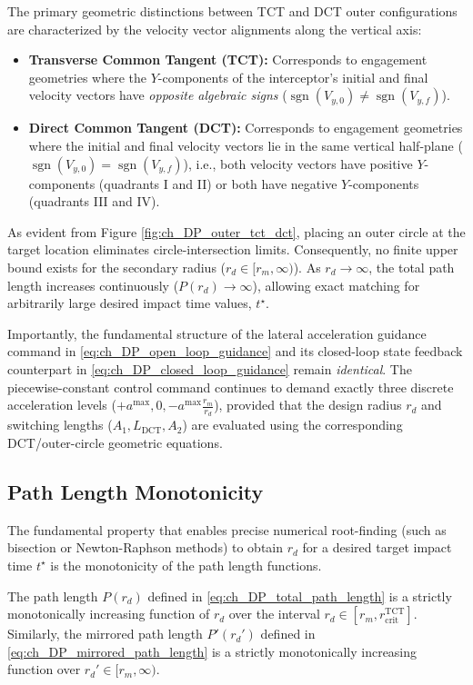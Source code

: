 The primary geometric distinctions between TCT and DCT outer configurations are characterized by the velocity vector alignments along the vertical axis:
\begin{itemize}
    \item \textbf{Transverse Common Tangent (TCT):} Corresponds to engagement geometries where the $Y$-components of the interceptor's initial and final velocity vectors have \emph{opposite algebraic signs} ($\operatorname{sgn}(V_{y,0}) \neq \operatorname{sgn}(V_{y,f})$).
    \item \textbf{Direct Common Tangent (DCT):} Corresponds to engagement geometries where the initial and final velocity vectors lie in the same vertical half-plane ($\operatorname{sgn}(V_{y,0}) = \operatorname{sgn}(V_{y,f})$), i.e., both velocity vectors have positive $Y$-components (quadrants I and II) or both have negative $Y$-components (quadrants III and IV).
\end{itemize}

As evident from Figure \ref{fig:ch_DP_outer_tct_dct}, placing an outer circle at the target location eliminates circle-intersection limits. Consequently, no finite upper bound exists for the secondary radius ($r_d \in [r_m, \infty)$). As $r_d \to \infty$, the total path length increases continuously ($P(r_d) \to \infty$), allowing exact matching for arbitrarily large desired impact time values, $t^{\star}$.

Importantly, the fundamental structure of the lateral acceleration guidance command in \eqref{eq:ch_DP_open_loop_guidance} and its closed-loop state feedback counterpart in \eqref{eq:ch_DP_closed_loop_guidance} remain \emph{identical}. The piecewise-constant control command continues to demand exactly three discrete acceleration levels ($+a^{\max}, 0, -a^{\max}\frac{r_m}{r_d}$), provided that the design radius $r_d$ and switching lengths ($A_1, L_{\text{DCT}}, A_2$) are evaluated using the corresponding DCT/outer-circle geometric equations.
\subsection{Path Length Monotonicity}\label{subsec:ch_DP_monotonicity}

The fundamental property that enables precise numerical root-finding (such as bisection or Newton-Raphson methods) to obtain $r_d$ for a desired target impact time $t^\star$ is the monotonicity of the path length functions.

\begin{remark}\label{rem:ch_DP_monotonicity}
The path length $P(r_d)$ defined in \eqref{eq:ch_DP_total_path_length} is a strictly monotonically increasing function of $r_d$ over the interval $r_d \in [r_m, r_{\text{crit}}^{\text{TCT}}]$. Similarly, the mirrored path length $P'(r_d')$ defined in \eqref{eq:ch_DP_mirrored_path_length} is a strictly monotonically increasing function over $r_d' \in [r_m, \infty)$.
\end{remark}


